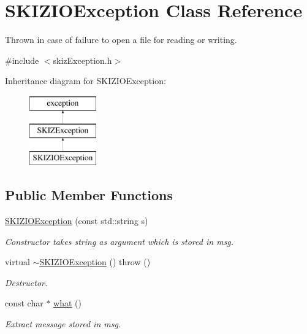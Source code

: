 \hypertarget{classSKIZIOException}{}\section{S\+K\+I\+Z\+I\+O\+Exception Class Reference}
\label{classSKIZIOException}


Thrown in case of failure to open a file for reading or writing.  




{\ttfamily \#include $<$skiz\+Exception.\+h$>$}

Inheritance diagram for S\+K\+I\+Z\+I\+O\+Exception\+:\begin{figure}[H]
\begin{center}
\leavevmode
\includegraphics[height=3.000000cm]{classSKIZIOException}
\end{center}
\end{figure}
\subsection*{Public Member Functions}
\begin{DoxyCompactItemize}
\item 
\mbox{\label{classSKIZIOException_a9f25dbc11996a8755965923611cce128}} 
\mbox{\hyperlink{classSKIZIOException_a9f25dbc11996a8755965923611cce128}{S\+K\+I\+Z\+I\+O\+Exception}} (const std\+::string s)
\begin{DoxyCompactList}\small\item\em Constructor takes string as argument which is stored in msg. \end{DoxyCompactList}\item 
\mbox{\label{classSKIZIOException_af331baab993a6666a5f6509a332510b3}} 
virtual \mbox{\hyperlink{classSKIZIOException_af331baab993a6666a5f6509a332510b3}{$\sim$\+S\+K\+I\+Z\+I\+O\+Exception}} ()  throw ()
\begin{DoxyCompactList}\small\item\em Destructor. \end{DoxyCompactList}\item 
\mbox{\label{classSKIZIOException_a9c1c40e5e47cb51fb0fb3803cdae4a76}} 
const char $\ast$ \mbox{\hyperlink{classSKIZIOException_a9c1c40e5e47cb51fb0fb3803cdae4a76}{what}} ()
\begin{DoxyCompactList}\small\item\em Extract message stored in msg. \end{DoxyCompactList}\end{DoxyCompactItemize}


